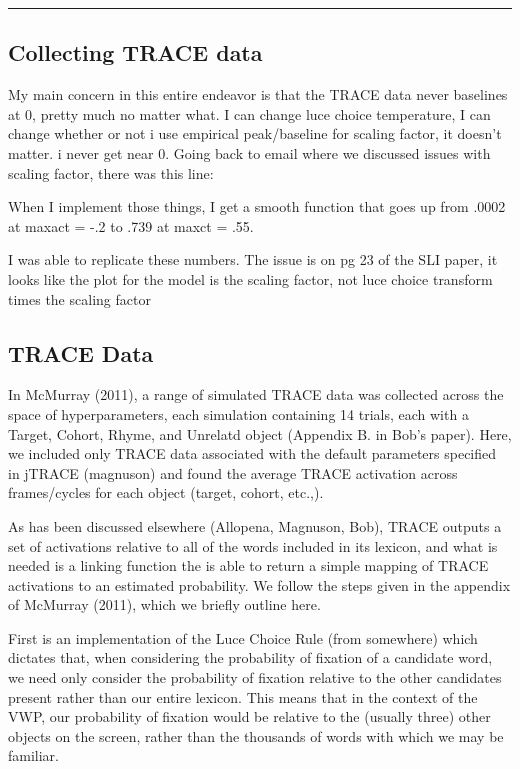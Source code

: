 \documentclass{article}
\begin{document}
\noindent\rule{2cm}{0.4pt}

\subsection{Collecting TRACE data}

My main concern in this entire endeavor is that the TRACE data never baselines at 0, pretty much no matter what. I can change luce choice temperature, I can change whether or not i use empirical peak/baseline for scaling factor, it doesn't matter.  i never get near 0. Going back to email where we discussed issues with scaling factor, there was this line:

When I implement those things, I get a smooth function that goes up from .0002 at maxact = -.2 to .739 at maxct = .55.  

I was able to replicate these numbers. The issue is on pg 23 of the SLI paper, it looks like the plot for the model is the scaling factor, not luce choice transform times the scaling factor


\subsection{TRACE Data}

In McMurray (2011), a range of simulated TRACE data was collected across the space of hyperparameters, each simulation containing 14 trials, each with a Target, Cohort, Rhyme, and Unrelatd object (Appendix B. in Bob's paper). Here, we included only TRACE data associated with the default parameters specified in jTRACE (magnuson) and found the average TRACE activation across frames/cycles for each object (target, cohort, etc.,).

As has been discussed elsewhere (Allopena, Magnuson, Bob), TRACE outputs a set of activations relative to all of the words included in its lexicon, and what is needed is a linking function the is able to return a simple mapping of TRACE activations to an estimated probability. We follow the steps given in the appendix of McMurray (2011), which we briefly outline here. 

First is an implementation of the Luce Choice Rule (from somewhere) which dictates that, when considering the probability of fixation of a candidate word, we need only consider the probability of fixation relative to the other candidates present rather than our entire lexicon. This means that in the context of the VWP, our probability of fixation would be relative to the (usually three) other objects on the screen, rather than the thousands of words with which we may be familiar.  
\end{document}
